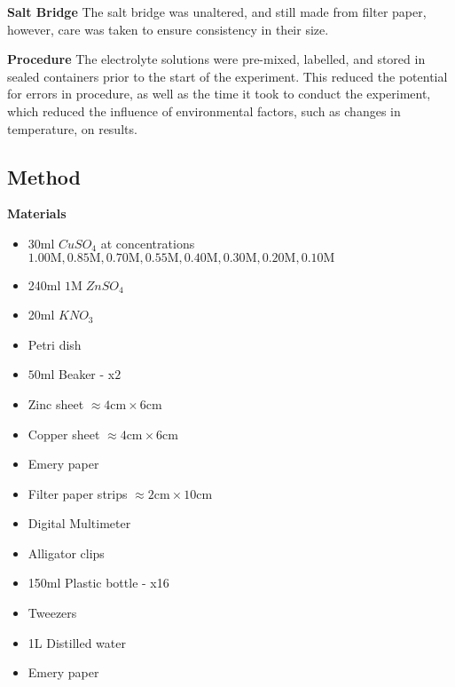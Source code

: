 \documentclass[11pt,a4paper]{article}
\begin{document}
\textbf{Salt Bridge}\newline
The salt bridge was unaltered, and still made from filter paper, however, care was taken to ensure consistency in their size.

\textbf{Procedure}\newline
The electrolyte solutions were pre-mixed, labelled, and stored in sealed containers prior to the start of the experiment. This reduced the potential for errors in procedure, as well as the time it took to conduct the experiment, which reduced the influence of environmental factors, such as changes in temperature, on results.

\subsection{Method}
\textbf{Materials}
\begin{itemize}
	\item 30ml $CuSO_4$ at concentrations $1.00\textrm{M}, 0.85\textrm{M}, 0.70\textrm{M}, 0.55\textrm{M}, 0.40\textrm{M}, 0.30\textrm{M}, 0.20\textrm{M}, 0.10\textrm{M}$
	\item 240ml $1$M$\;ZnSO_4$
	\item 20ml $KNO_3$
	\item Petri dish
	\item $50\textrm{ml}$ Beaker - x$2$
	\item Zinc sheet $\approx4\textrm{cm}\times6\textrm{cm}$ 
	\item Copper sheet $\approx4\textrm{cm}\times6\textrm{cm}$ 
	\item Emery paper
	\item Filter paper strips $\approx 2\textrm{cm}\times10\textrm{cm}$
	\item Digital Multimeter
	\item Alligator clips
	\item 150ml Plastic bottle - x16
	\item Tweezers 
	\item 1L Distilled water
	\item Emery paper
\end{itemize}
\end{document}
